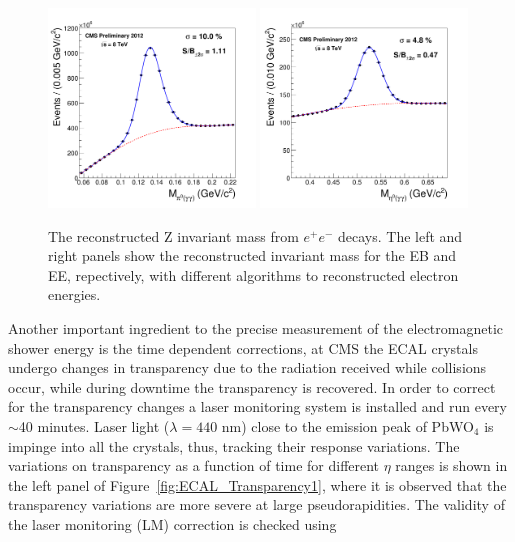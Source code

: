 \begin{figure}
 \centering
\includegraphics[width=0.49\textwidth]{CMS_DetectorFigures/EB_2012_pi0.png}
\includegraphics[width=0.49\textwidth]{CMS_DetectorFigures/EB_2012_eta0.png}
\caption{The reconstructed Z invariant mass from $e^{+}e^{-}$
  decays. The left and right panels show the reconstructed invariant mass for
  the EB and EE, repectively, with different algorithms to reconstructed electron energies.\label{fig:ECAL_pizero}}
\end{figure}
Another important ingredient to the precise measurement of the
electromagnetic shower energy is the time dependent corrections, at
CMS the ECAL crystals undergo changes in transparency due to the
radiation received while collisions occur, while  during downtime the
transparency is recovered. In order to correct for the transparency
changes a laser monitoring system is installed and run every $\sim$40
minutes. Laser light ($\lambda = 440$ nm) close to the emission peak of PbWO$_{4}$
is impinge into all the crystals, thus, tracking their response
variations. The variations on transparency as a function of time for
different $\eta$ ranges is shown in
the left panel of Figure~\ref{fig:ECAL_Transparency1}, where it is observed that the
transparency variations are more severe at large pseudorapidities. The
validity of the laser monitoring (LM) correction is checked using
